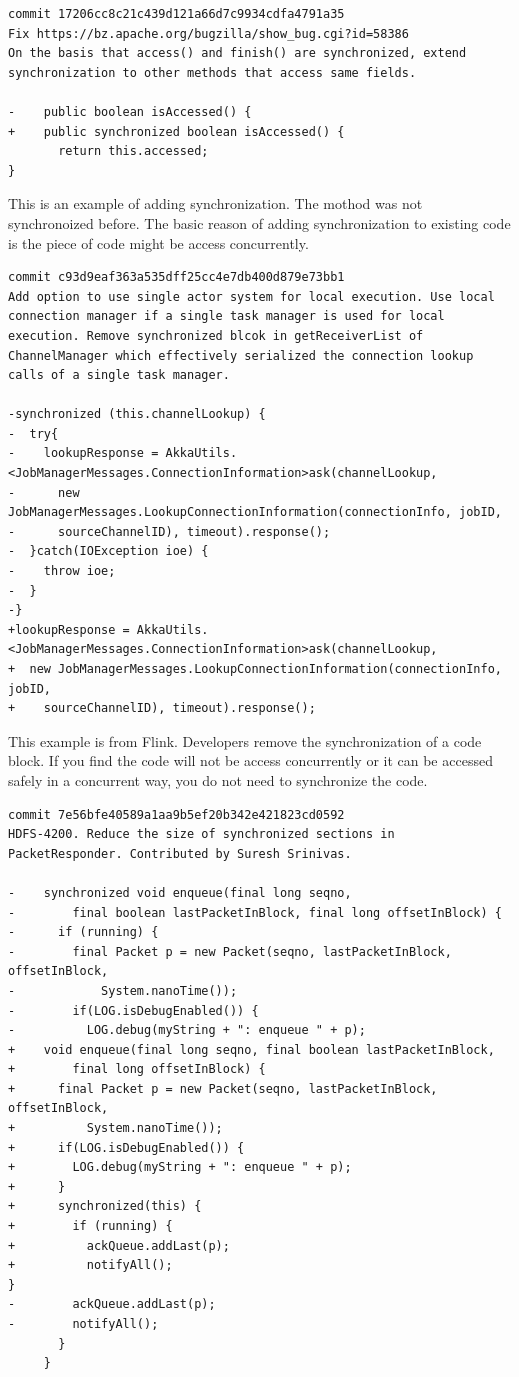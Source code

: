 \begin{lstlisting}
commit 17206cc8c21c439d121a66d7c9934cdfa4791a35
Fix https://bz.apache.org/bugzilla/show_bug.cgi?id=58386
On the basis that access() and finish() are synchronized, extend synchronization to other methods that access same fields.

-    public boolean isAccessed() {
+    public synchronized boolean isAccessed() {
       return this.accessed;
}
\end{lstlisting}

This is an example of adding synchronization. The mothod was not synchronoized before. The basic reason of adding synchronization to existing code is the piece of code might be access concurrently.

\begin{lstlisting}
commit c93d9eaf363a535dff25cc4e7db400d879e73bb1
Add option to use single actor system for local execution. Use local connection manager if a single task manager is used for local execution. Remove synchronized blcok in getReceiverList of ChannelManager which effectively serialized the connection lookup calls of a single task manager.

-synchronized (this.channelLookup) {
-  try{
-    lookupResponse = AkkaUtils.<JobManagerMessages.ConnectionInformation>ask(channelLookup,
-      new JobManagerMessages.LookupConnectionInformation(connectionInfo, jobID,
-      sourceChannelID), timeout).response();
-  }catch(IOException ioe) {
-    throw ioe;
-  }
-}
+lookupResponse = AkkaUtils.<JobManagerMessages.ConnectionInformation>ask(channelLookup,
+  new JobManagerMessages.LookupConnectionInformation(connectionInfo, jobID,
+    sourceChannelID), timeout).response();
\end{lstlisting}

This example is from Flink. Developers remove the synchronization of a code block. If you find the code will not be access concurrently or it can be accessed safely in a concurrent way, you do not need to synchronize the code.

\begin{lstlisting}
commit 7e56bfe40589a1aa9b5ef20b342e421823cd0592
HDFS-4200. Reduce the size of synchronized sections in PacketResponder. Contributed by Suresh Srinivas.

-    synchronized void enqueue(final long seqno,
-        final boolean lastPacketInBlock, final long offsetInBlock) {
-      if (running) {
-        final Packet p = new Packet(seqno, lastPacketInBlock, offsetInBlock,
-            System.nanoTime());
-        if(LOG.isDebugEnabled()) {
-          LOG.debug(myString + ": enqueue " + p);
+    void enqueue(final long seqno, final boolean lastPacketInBlock,
+        final long offsetInBlock) {
+      final Packet p = new Packet(seqno, lastPacketInBlock, offsetInBlock,
+          System.nanoTime());
+      if(LOG.isDebugEnabled()) {
+        LOG.debug(myString + ": enqueue " + p);
+      }
+      synchronized(this) {
+        if (running) {
+          ackQueue.addLast(p);
+          notifyAll();
}
-        ackQueue.addLast(p);
-        notifyAll();
       }
     }
\end{lstlisting}

